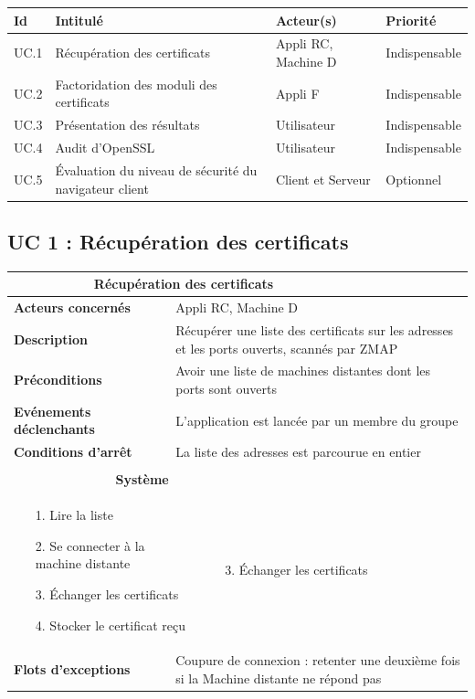 \documentclass[a4paper,11pt,french]{article}
\newcommand{\fiche}[9] {
	\noindent
\begin{tabular}{|p{4cm}| p{2cm} | p{4cm} | p{.5cm} | p{7cm}|} 
\hline
\rowcolor{blue}
\multicolumn{2}{|l|}{\color{white}\bfseries{Nom}} & \multicolumn{3}{l|}{\color{white}\bfseries{#1}}\\
\hline
\multicolumn{2}{|l|}{\bfseries{Acteurs concernés}} & \multicolumn{3}{m{10.5cm}|}{#2}\\
\hline
\multicolumn{2}{|l|}{\bfseries{Description}} & \multicolumn{3}{m{10.5cm}|}{#3}\\
\hline
\multicolumn{2}{|l|}{\bfseries{Préconditions}} & \multicolumn{3}{m{10.5cm}|}{#4}\\
\hline
\multicolumn{2}{|l|}{\bfseries{Evénements déclenchants}} & \multicolumn{3}{m{10.5cm}|}{#5}\\
\hline
\multicolumn{2}{|l|}{\bfseries{Conditions d'arrêt}} & \multicolumn{3}{m{10.5cm}|}{#6}\\
\hline
\rowcolor{gray}
\multicolumn{5}{|c|}{\bfseries{Description du flot d'événements principal}}\\
\hline
\rowcolor{gray}
\multicolumn{3}{|c|}{\bfseries{Acteur(s)}} & \multicolumn{2}{c|}{\bfseries{Système}}\\
\hline
\multicolumn{3}{|p{7.5cm}|}{#7} & \multicolumn{2}{p{7.5cm}|}{#8}\\
\hline
\multicolumn{2}{|l}{\bfseries{Flots d'exceptions}} & \multicolumn{3}{|p{11.5cm}|}{#9}\\
\hline
\end{tabular}
\\
}
\begin{document}
\begin{center}
\begin{tabular}{|l|p{6cm}|p{6cm}|l|}
\hline
\bfseries{Id} & \bfseries{Intitulé} & \bfseries{Acteur(s)} & \bfseries{Priorité}\\
\hline
UC.1 & Récupération des certificats & Appli RC, Machine D & Indispensable\\
\hline
UC.2 & Factoridation des moduli des certificats & Appli F & Indispensable\\
\hline
UC.3 & Présentation des résultats & Utilisateur & Indispensable\\
\hline
UC.4 & Audit d'OpenSSL & Utilisateur & Indispensable\\
\hline
UC.5 & Évaluation du niveau de sécurité du navigateur client & Client et Serveur & Optionnel\\
\hline
\end{tabular}
\end{center}


\subsection{UC 1 : Récupération des certificats}

\fiche
	{Récupération des certificats} %
	{Appli RC, Machine D} %
	{Récupérer une liste des certificats sur les adresses et les ports ouverts, scannés par ZMAP} %
	{Avoir une liste de machines distantes dont les ports sont ouverts} %
	{L'application est lancée par un membre du groupe} %
	{La liste des adresses est parcourue en entier} %
	{\begin{itemize}  %
		\item [1.] Lire la liste
		\item [2.] Se connecter à la machine distante
		\item [3.] Échanger les certificats
		\item [4.] Stocker le certificat reçu
	 \end{itemize}
	} 
	{\begin{itemize}  %
		\item []
		\item []
		\item [3.] Échanger les certificats
	\end{itemize}
	 }
	{Coupure de connexion : retenter une deuxième fois si la Machine distante ne répond pas} %
\end{document}
